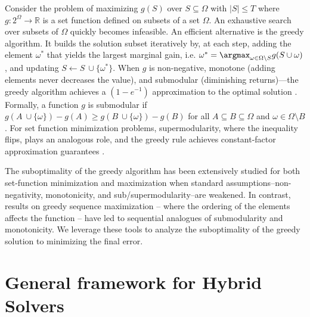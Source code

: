 \documentclass{article} %
\begin{document}
Consider the problem of maximizing $g(S)$ over $S\subseteq \Omega$ with $|S| \leq T$ where $g: 2^{\Omega} \to \mathbb{R}$ is a set function defined on subsets of a set $\Omega$. An exhaustive search over subsets of $\Omega$ quickly becomes infeasible. An efficient alternative is the greedy algorithm. It builds the solution subset iteratively by, at each step, adding the element $\omega^*$ that yields the largest marginal gain, i.e. $\omega^* =  \argmax_{\omega \in \Omega \setminus S} g(S \cup \omega)$, and updating $S \leftarrow S \ \cup \{\omega^*\}$. When $g$ is non-negative, monotone (adding elements never decreases the value), and submodular (diminishing returns)—the greedy algorithm achieves a $(1 - e^{-1})$ approximation to the optimal solution \citep{nemhauser1978analysis}. Formally, a function $g$ is submodular if $g(A \ \cup \{\omega\}) - g(A) \geq g(B \ \cup \{\omega\}) - g(B)$ for all $A \subseteq B \subseteq \Omega$ and $\omega \in \Omega \setminus B$. For set function minimization problems, supermodularity, where the inequality flips, plays an analogous role, and the greedy rule achieves constant-factor approximation guarantees \citep{liberty2017greedy}.

The suboptimality of the greedy algorithm has been extensively studied for both set-function minimization \citep{bounia2023approximating}  and maximization \citep{das2018approximate,feige2011maximizing,bian2017guarantees,harshaw2019submodular} when standard assumptions--non-negativity, monotonicity, and sub/supermodularity--are weakened. In contrast, results on greedy sequence maximization \citep{streeter2008online,alaei2021maximizing,zhang2015string,bernardini2020through,van2024performance,tschiatschek2017selecting} -- where the ordering of the elements affects the function -- have led to sequential analogues of submodularity and monotonicity. We leverage these tools to analyze the suboptimality of the greedy solution to minimizing the final error.


\section{General framework for Hybrid Solvers}

\end{document}
